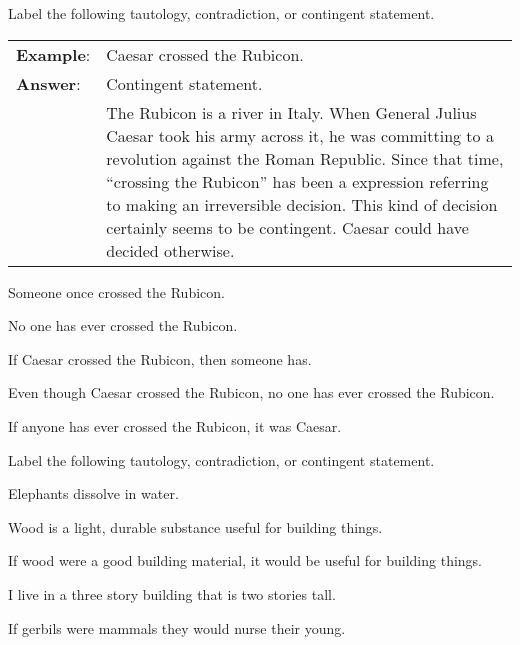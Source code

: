 


\practiceproblems
\noindent \problempart \label{pr.EnglishTautology} Label the following tautology, contradiction, or contingent statement.

\begin{longtabu}{p{.1\linewidth}p{.9\linewidth}}
\textbf{Example}: & Caesar crossed the Rubicon. \\
\textbf{Answer}: & Contingent statement. \\
&The Rubicon is a river in Italy. When General Julius Caesar took his army across it, he was committing to a revolution against the Roman Republic. Since that time, ``crossing the Rubicon'' has been a expression referring to making an irreversible decision. This kind of decision certainly seems to be contingent. Caesar could have decided otherwise.\\
\end{longtabu}

\begin{exercises}
\item Someone once crossed the Rubicon. 
\item No one has ever crossed the Rubicon. 
\item If Caesar crossed the Rubicon, then someone has. 
\item Even though Caesar crossed the Rubicon, no one has ever crossed the Rubicon. 
\item If anyone has ever crossed the Rubicon, it was Caesar. 
\end{exercises}

\noindent \problempart Label the following tautology, contradiction, or contingent statement.
\begin{exercises}
\item Elephants dissolve in water. 
\item Wood is a light, durable substance useful for building things. 
\item If wood were a good building material, it would be useful for building things. 
\item I live in a three story building that is two stories tall. 
\item If gerbils were mammals they would nurse their young. 
\end{exercises}

